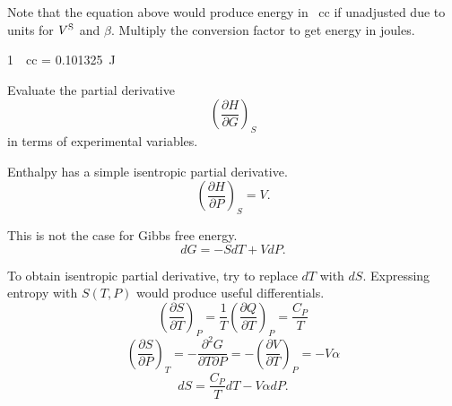 \begin{@empty}
\begin{answer}
\begin{enumerate}
            Note that the equation above would produce energy in \si{\atm.cc}
            if unadjusted due to units for $V^{\text S}$ and $\beta$.  Multiply
            the conversion factor to get energy in joules.
            \begin{center}
                \SI{1}{\atm.cc} = \SI{0.101325}{\joule}
            \end{center}
    \end{enumerate}
\end{answer}

\begin{problem}
\end{problem}

\begin{problem}
\end{problem}

\begin{problem}
\end{problem}

\begin{problem}
\end{problem}

\begin{problem}
    Evaluate the partial derivative
    \[ \left( \frac{\partial H}{\partial G} \right)_S \]
    in terms of experimental variables.
\end{problem}

\begin{answer}
    Enthalpy has a simple isentropic partial derivative.
    \begin{equation}
       \left( \frac{\partial H}{\partial P} \right)_S = V. \label{eq:HPS}
    \end{equation}

    This is not the case for Gibbs free energy.
    \begin{equation}
        dG = -SdT + VdP. \label{eq:dG}
    \end{equation}

    To obtain isentropic partial derivative, try to replace $dT$ with $dS$.
    Expressing entropy with $S(T, P)$ would produce useful differentials.
    \[
        \left( \frac{\partial S}{\partial T} \right)_P
        = \frac1T \left( \frac{\partial Q}{\partial T} \right)_P
        = \frac{C_P}{T}
    \]
    \[
        \left( \frac{\partial S}{\partial P} \right)_T
        = -\frac{\partial^2 G}{\partial T \partial P}
        = -\left( \frac{\partial V}{\partial T} \right)_P
        = -V \alpha
    \]
    \[ dS = \frac{C_P}{T} dT - V \alpha dP. \]


\end{answer}
\end{@empty}
